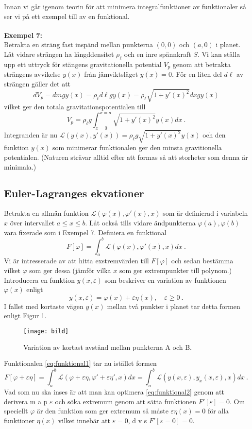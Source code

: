 \documentclass{article}
\begin{document}
Innan vi går igenom teorin för att minimera integralfunktioner av funktionaler så ser vi på ett exempel till av en funktional.\\ \\
\textbf{Exempel 7:}\\ Betrakta en sträng fast inspänd mellan punkterna $(0,0)$ och $(a,0)$ i planet. Låt vidare strängen ha längddensitet $\rho_{\ell}$ och en inre spännkraft $S$. Vi kan ställa upp ett uttryck för stängens gravitationella potential $V_p$ genom att betrakta strängens avvikelse $y(x)$ från jämviktsläget $y(x)=0$. För en liten del $d\ell$ av strängen gäller det att
$$
dV_p=dmgy(x)=\rho_{\ell}d\ell gy(x)=\rho_{\ell}\sqrt{1+y'(x)^2}dx gy(x)
$$
vilket ger den totala gravitationspotentialen till
$$
V_p=\rho_{\ell}g\int_{x=0}^{x=a}\sqrt{1+y'(x)^2}y(x)dx \ .
$$
Integranden är nu $\mathcal{L}(y(x),y'(x))=\rho_{\ell}g\sqrt{1+y'(x)^2}y(x)$ och den funktion $y(x)$ som minimerar funktionalen ger den minsta gravitionella potentialen. (Naturen strävar alltid efter att formas så att storheter som denna är minimala.)
\subsection{Euler-Lagranges ekvationer}
Betrakta en allmän funktion $\mathcal{L}(\varphi(x),\varphi'(x),x)$ som är definierad i variabeln $x$ över intervallet $a\leq x\leq b$. Låt också tills vidare ändpunkterna $\varphi(a),\varphi(b)$ vara fixerade som i Exempel 7. Definiera en funktional
\begin{equation}\label{eq:funktional1}
    F[\varphi]=\int_a^b\mathcal{L}(\varphi(x),\varphi'(x),x)dx \ .
\end{equation}
Vi är intresserade av att hitta exstremvärden till $F[\varphi]$ och sedan bestämma vilket $\varphi$ som ger dessa (jämför vilka $x$ som ger extrempunkter till polynom.)\\

Introducera en funktion $y(x,\varepsilon)$ som beskriver en variation av funktionen $\varphi(x)$ enligt $$
y(x,\varepsilon)=\varphi(x)+\varepsilon\eta(x), \quad \varepsilon\geq 0 \ .
$$
I fallet med kortaste vägen $y(x)$ mellan två punkter i planet tar detta formen enligt Figur 1.
\begin{figure}[H]
\begin{center} 
\texttt{[image: bild]}
\caption{Variation av kortast avstånd mellan punkterna A och B.}
\label{fig:fig1}
\end{center}
\end{figure}
Funktionalen \eqref{eq:funktional1} tar nu istället formen
\begin{equation}\label{eq:funktional2}
    F[\varphi+\varepsilon\eta]=\int_a^b\mathcal{L}(\varphi+\varepsilon\eta,\varphi'+\varepsilon\eta',x)dx=\int_a^b\mathcal{L}(y(x,\varepsilon),y_x(x,\varepsilon),x)dx \ .
\end{equation}
Vad som nu ska inses är att man kan optimera \eqref{eq:funktional2} genom att derivera m a p $\varepsilon$ och söka extremum genom att sätta funktionen $F'[\varepsilon]=0$. Om speciellt $\varphi$ är den funktion som ger extremum så måste $\varepsilon\eta(x)=0$ för alla funktioner $\eta(x)$ vilket innebär att $\varepsilon=0$, d v s $F'[\varepsilon=0]=0$.
\end{document}
